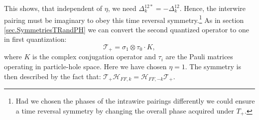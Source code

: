 This shows, that independent of $\eta$, we need $\Delta^{12*}_k = - \Delta^{12}_k$. Hence, the interwire pairing must be imaginary to obey this time reversal symmetry.\footnote{Had we chosen the phases of the intrawire pairings differently we could ensure a time reversal symmetry by changing the overall phase acquired under $T_+$.} As in section \ref{sec.SymmetriesTRandPH} we can convert the second quantized operator to one in first quantization:
\begin{equation}
\mathcal{T}_+ = \sigma_1\otimes \tau_0 \cdot K, 
\label{eq.2wiresTpluswireexchangefirstquantization}
\end{equation}
where $K$ is the complex conjugation operator and $\tau_i$ are the Pauli matrices operating in particle-hole space. Here we have chosen $\eta = 1$. The symmetry is then described by the fact that: $\mathcal{T}_+\mathcal{H}_{FF,k} = \mathcal{H}_{FF,-k}\mathcal{T}_+$.

